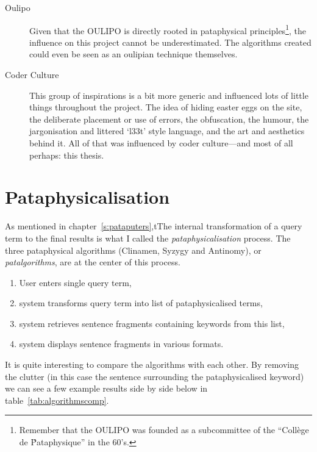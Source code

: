 \begin{description}
  \item[Oulipo] Given that the \ac{OULIPO} is directly rooted in pataphysical principles\footnote{Remember that the \ac{OULIPO} was founded as a subcommittee of the ``Coll\`{e}ge de \'Pataphysique'' in the 60's.}, the influence on this project cannot be underestimated. The algorithms created could even be seen as an oulipian technique themselves.
  \item[Coder Culture] This group of inspirations is a bit more generic and influenced lots of little things throughout the project. The idea of hiding easter eggs on the site, the deliberate placement or use of errors, the obfuscation, the humour, the jargonisation and littered `l33t' style language, and the art and aesthetics behind it. All of that was influenced by coder culture---and most of all perhaps: this thesis.
\end{description}


\section{Pataphysicalisation}

As mentioned in chapter~\ref{s:pataputers},tThe internal transformation of a query term to the final results is what I called the \emph{pataphysicalisation} process. The three pataphysical algorithms (Clinamen, Syzygy and Antinomy), or \emph{patalgorithms}, are at the center of this process. 

\begin{enumerate}
  \item User enters single query term,
  \item system transforms query term into list of pataphysicalised terms,
  \item system retrieves sentence fragments containing keywords from this list,
  \item system displays sentence fragments in various formats.
\end{enumerate}

It is quite interesting to compare the algorithms with each other. By removing the clutter (in this case the sentence surrounding the pataphysicalised keyword) we can see a few example results side by side below in table~\ref{tab:algorithmscomp}.

